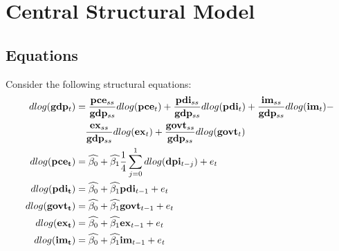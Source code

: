 \documentclass[11pt, letterpaper]{article}\usepackage[]{graphicx}\usepackage[]{color}
\newcommand{\vv}[1]{\textcolor{black}{\mathbf{#1}}}
\begin{document}




\tableofcontents
\newpage
\listoftables
\listoffigures
\newpage
\section{Central Structural Model}
\subsection{Equations}

Consider the following structural equations:
\begin{align*}
    dlog(\vv{gdp}_t) &= \frac{\vv{pce}_{ss}}{\vv{gdp}_{ss}} dlog(\vv{pce}_t) + \frac{\vv{pdi}_{ss}}{\vv{gdp}_{ss}} dlog(\vv{pdi}_t) + \frac{\vv{im}_{ss}}{\vv{gdp}_{ss}} dlog(\vv{im}_t) -\\
    &\quad{} \frac{\vv{ex}_{ss}}{\vv{gdp}_{ss}} dlog(\vv{ex}_t) + \frac{\vv{govt}_{ss}}{\vv{gdp}_{ss}} dlog(\vv{govt}_t)\\
   	dlog(\vv{pce_t}) &= \widehat{\beta_0} + \widehat{\beta_1} \frac{1}{4} \sum_{j=0}^1 dlog(\vv{dpi}_{t-j}) + e_t\\
   	dlog(\vv{pdi_t}) &= \widehat{\beta_0}  + \widehat{\beta_1} \vv{pdi}_{t-1} + e_t\\
   	dlog(\vv{govt_t}) &=  \widehat{\beta_0}  + \widehat{\beta_1} \vv{govt}_{t-1} + e_t\\
   	dlog(\vv{ex_t}) &=  \widehat{\beta_0}  + \widehat{\beta_1} \vv{ex}_{t-1} + e_t\\
   	dlog(\vv{im_t}) &=  \widehat{\beta_0}  + \widehat{\beta_1} \vv{im}_{t-1} + e_t
\end{align*}
\end{document}
